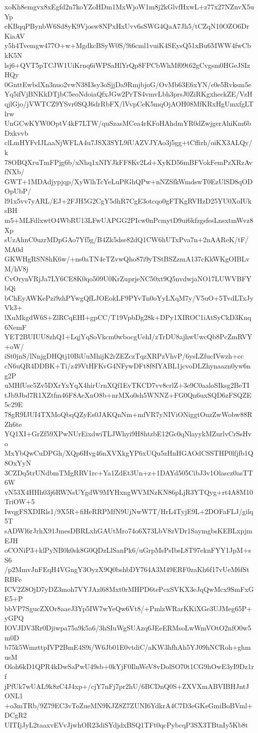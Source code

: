 xoKh8emgvx8xEgfd2n7koYZoHDm1MxWjoW1m8j2kGlvfHxwL+z77x27NZnvX5uYp
eKBqqPBynbW6Sd8yK9Vjosw8NPxHxUvv6sSWG4QaA7Jh5/tCZqN10OZO6DrKiaAV
y5h4Tvemgw477O+w+MgdkcBSyW0S/9i6cml1vuiK4SEysQ51xBu6MWW4fwCbkK5N
lsj6+QVT5pTCJW1UiKrnq6iWPSaHlYrQp8FPCbWhMf09t62gCvgsm0HGeJSIzHQy
0GnttEwbdXn3nuo2vwN38I3sy3oSjjDa9RmjbjoG/OvMb63E6xYN/c0e5Rvksm5e
Yq5ifVjBNKkDTjbC5eoNdoiaQfxJGw2PrTS4vmvLbh3prsJ0ZiRKgxheckZE/VzH
qjlGjo/jVWTCZ9YSvr0SQJ6drRbFX/lVvpCeK5mqOjAOH08MfKRxHgUmxfgLTlrw
UnGCwKYW0OptV4kF7LTW/quSzasMCea4rKFoHAhdmYR0dZwjgerAhiKm6bDxkvvb
clLmHYFvIJLaaNjWFLA4u7JSX3SYL9fUAZVJYAo3j5gg+tCffirh/oiKX3ALQy/k
78OBQXruTmFPjg6b/xNhq1xNIYJkFF8Kv2Ld+XyKD56mBFVokFemPzXRzAvfNXb/
GWT+1MDAdjypjqp/XyWlhTcYeLuPfGhQPw+nNZSfkWmdswT0EzUlSD8qODOpUbP/
l91x5vv7yARL/EJ+2FJH5G2CgY5dhR7CgE3otcqo0gFTKgRVHzD25YU0XoIUksBH
m5+MLFdlxwtO4WbRU13LFwUAPGG2PIcw0nPcmytD9ui6kfzgsfesLnsxtmWvz8Xp
sUzAhnC0uzrMDpGAo7Yf5g/B4Zk5dse82dQ1CW6hUTxPva7n+2nAAReK/tF/MA0d
GKWHgRSN8hK6w/+ns0aTN4eTZvwQho87i9yTStBSZzmA137cKkWKgOIBLvM/hV8j
CvOrynVRjJa7LY6CE8K0qo509U0KrZuprjeNC50xt9Q5nvdwjaNO17LUWVBFYbQi
bChEyAWKePzi9zhPYwgQfLJOEokLF9PYvTn0oYyLXqM7y/V5uO+5TvdLTxJyVk3+
lXuMkgdW6S+ZlRCqEHI+gpCC/T19VpbDg28k+DPy1XIROC1iAtSyCkD3Knq6NemF
YET2BUIUU8zhQ1+LqjYqSoVkcm0wbocgUehI/zTrDU8ajhwUwcQb8PcZmRVY+oW/
iSt0jnS/lNnjgDHQtj10BiUuMhijK2rZEZczTqzXRPzVhvP/6ysLZfucIVwzh+cc
cN6uQR4DDBK+Ti/z49VtHFKvG4NFywDFt8f8IYABL1jcvoDLZhynaazn0yw6ng2P
uMHfUsc5Zv5DXrYxYqX4hirUrnXQf1EvTKCD7vv8crlZ+3e9C0aaloSIksg2BeTI
tJb9Jbd7R1XZtfm46F8AeXnO8b+nrMXo0sh5WNNZ+FG0Qn6uxSQD6zFSQZE5c29E
78gR9IJUI4TXMoQbqQZyEs0JAKQnNm+mfVR7yNIViONiggtOuzZwWobw88RZh6te
YQ1XI+GrZf59XPwNUrEixdwiTLJWhyi9H8htzbE12Gc0qNlayykMZurlvCrSsHvo
MxYbQwCuDPGh/XQp6Hvg46nXVXkgYP6xUQu5zHnHGAOdCSSTHP0lfjfb1Q8OxYyN
3CZDq5trUNdbmTMgRRV1rc+Ya1ZdEt3Un+z+1DAYd505CibJ3v1Olascz0asTT6W
vN53X4HHh03j6RWNsUYgdW9MYHxngWVMNzKN86pLjR3YTQyg+rt4A8M10TriOW+5
IwqgFSXDIRls1/9X5R+fiHeRRPMfN9UjNwW7T/HrL4TyjE9L+2DOFaFLJ/gilq5T
sADWl6rJrhX91JmesDBRLxhGAUtMro74o6X73LbV8zVDr1SaymgbsKEBLxpjmEJH
oCONiP3+klPyNB0k0sk8G0QDzLlSanPk6/uGrpMsPsIbsL8T97eknFYY1JpM+sS6
/p2MmvJnFEqH4VGngY3OyzX9Q0bshbDY764A3M49ERF0zaKh6f17vUeM6fStRBFe
ICV2Z8OjD7yDZ3moh7VYJAzl68Mxt0rMHPD6tePcxSVKX3eJqQwMcx9SmFxGE5+P
bbVP7SgucZXOr8aaeJ3Yp5IW7wYeQw6Vt8/+PmlzWRarKKiXGe3UJMeg65P+yGPQ
IOVJDV3Rr0Djiwpa75a9k5a6/3hSIuWgSUAzq6JEeERMsoLwWmVOtO2nfO0w5m0D
b75k5WmzttpIVP2BmE4S9i/W6Jb01E0vtdiC/aKW3hfhAh5YJ09hNCRoh+ghmusM
Oloh6kD1QPR4kDwSaPwU49sb+0kYjF0IlnWeV8vDolSO70t1CG9hOwE3yI9Dz1rf
jPfUk7wUAL9k8zC4J4xp+/cjY7nFj7pr2hU/6BCDnQ0S+ZXVXmABVIBHJntJONL1
+o3mTRb/9Z79EC3vToZueMN9KJZ8Z7ZUNI6YdkrA4C7D3eGKeGmiBoBVml+DCgR2
UITIjJyL2taaxvEVvJjwhOR23diSYdjdxBSQ1TFt0qcPybcqP3SX3TBtnIy5Kb8t
